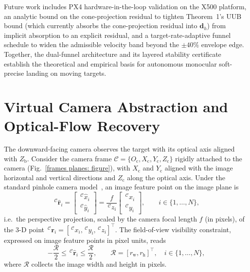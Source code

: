\documentclass{IEEEtaes}
\begin{document}
Future work includes PX4 hardware-in-the-loop validation on the X500 platform, an analytic bound on the cone-projection residual to tighten Theorem~1's UUB bound (which currently absorbs the cone-projection residual into $\boldsymbol{d}_h$) from implicit absorption to an explicit residual, and a target-rate-adaptive funnel schedule to widen the admissible velocity band beyond the $\pm 40\%$ envelope edge. Together, the dual-funnel architecture and its layered stability certificate establish the theoretical and empirical basis for autonomous monocular soft-precise landing on moving targets.

\appendices
\section{Virtual Camera Abstraction and Optical-Flow Recovery} \label{virtual camera: section}
The downward-facing camera observes the target with its optical axis aligned with $Z_\text{b}$. Consider the camera frame $\mathcal{C}=\{O_{\text{c}},X_{\text{c}},Y_{\text{c}},Z_{\text{c}}\}$ rigidly attached to the camera (Fig.~\ref{frames planes: figure}), with $X_{\text{c}}$ and $Y_{\text{c}}$ aligned with the image horizontal and vertical directions and $Z_{\text{c}}$ along the optical axis. Under the standard pinhole camera model~\cite{chaumette2006}, an image feature point on the image plane is
\begin{equation}
\label{pinhole camera model: equation}
    \,^\mathcal{C}\hat{\boldsymbol{r}}_i = \begin{bmatrix} \,^\mathcal{C}\hat{x}_i \\ \,^\mathcal{C}\hat{y}_i \end{bmatrix}
    = \frac{f}{\,^\mathcal{C}z_i}\begin{bmatrix} \,^\mathcal{C}x_i \\ \,^\mathcal{C}y_i \end{bmatrix},\qquad i\in\{1,\ldots,N\},
\end{equation}
i.e.\ the perspective projection, scaled by the camera focal length $f$ (in pixels), of the 3-D point $\,^\mathcal{C}\boldsymbol{r}_i=[\,^\mathcal{C}x_i,\,^\mathcal{C}y_i,\,^\mathcal{C}z_i]^{\top}$. The field-of-view visibility constraint, expressed on image feature points in pixel units, reads
\begin{equation} \label{visibility constraint: equation}
    -\frac{\mathcal{R}}{2} \le \,^\mathcal{C}\hat{\boldsymbol{r}}_i \le \frac{\mathcal{R}}{2},\qquad \mathcal{R}=[r_\text{w},r_\text{h}]^\top,\quad i\in\{1,\ldots,N\},
\end{equation}
where $\mathcal{R}$ collects the image width and height in pixels.
\end{document}
